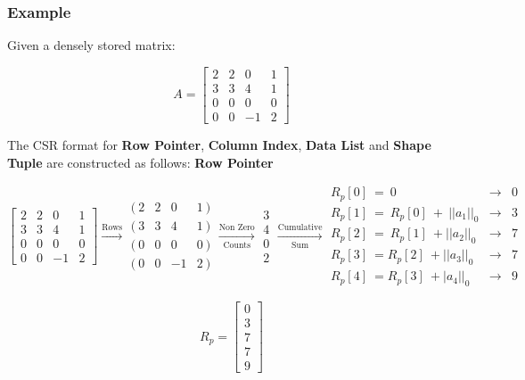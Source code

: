 \documentclass[12pt]{article}
\begin{document}
\subsubsection{Example}
Given a densely stored matrix:
\begin{center}
\begin{equation*}
	A=
	\begin{bmatrix}
		2&2&0&1\\
		3&3&4&1\\
		0&0&0&0\\
		0&0&-1&2
	\end{bmatrix}
\end{equation*}
\end{center}
The CSR format for \textbf{Row Pointer}, \textbf{Column Index}, \textbf{Data List} and \textbf{Shape Tuple} are constructed as follows: \newline \newline
\noindent
\textbf{Row Pointer}
\begin{center}
\begin{equation*}
\begin{bmatrix}
2 & 2 & 0 & 1\\
3 & 3 & 4 & 1\\
0 & 0 & 0 & 0\\
0 & 0 & -1 & 2
\end{bmatrix}\xrightarrow[\text{}]{\text{Rows}}\begin{matrix}
( \ 2 & 2 & 0 & 1\ )\\
( \ 3 & 3 & 4 & 1\ )\\
( \ 0 & 0 & 0 & 0\ )\\
( \ 0 & 0 & -1 & 2\ )
\end{matrix}\xrightarrow[\text{Counts}]{\text{Non Zero}}\begin{matrix}
3\\
4\\
0\\
2
\end{matrix}\xrightarrow[\text{Sum}]{\text{Cumulative}}\begin{matrix}
R_{p}[ 0] \ =\ 0 & \rightarrow  & 0 &  & \\
R_{p}[ 1] \ =\ R_{p}[ 0] \ +\ ||a_{1} ||_{0} & \rightarrow  & 3 &  & \\
R_{p}[ 2] \ =\ R_{p}[ 1] \ +||a_{2} ||_{0} & \rightarrow  & 7 &  & \\
R_{p}[ 3] \ =R_{p}[ 2] \ +||a_{3} ||_{0} & \rightarrow  & 7 &  & \\
R_{p}[ 4] \ =R_{p}[ 3] \ +|a_{4} ||_{0} & \rightarrow  & 9 &  & 
\end{matrix}
\end{equation*}
\end{center}
\begin{center}
\begin{equation*}
	R_p=
	\begin{bmatrix}
		0\\
		3\\
		7\\
		7\\
		9
	\end{bmatrix}
\end{equation*}
\end{center}
\end{document}
